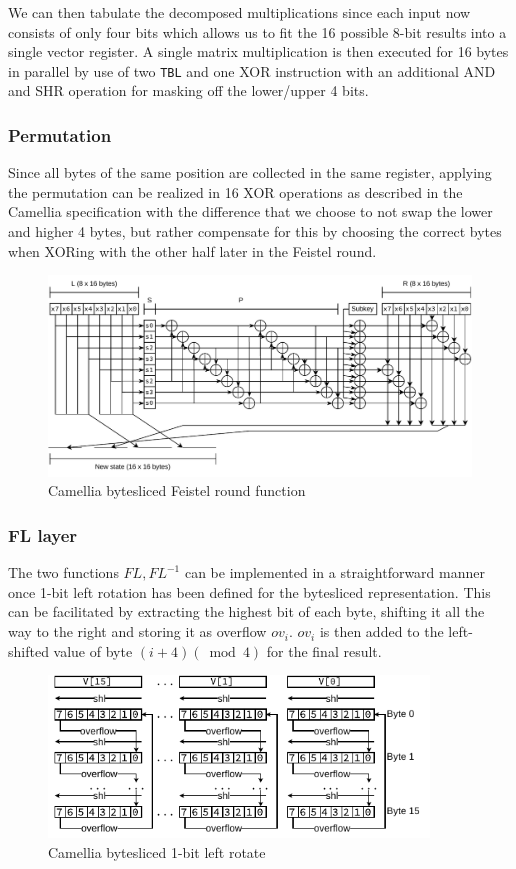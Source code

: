 We can then tabulate the decomposed multiplications since each input now
consists of only four bits which allows us to fit the 16 possible 8-bit results
into a single vector register. A single matrix multiplication is then executed
for 16 bytes in parallel by use of two \texttt{TBL} and one XOR instruction with
an additional AND and SHR operation for masking off the lower/upper 4 bits.

\subsubsection{Permutation}

Since all bytes of the same position are collected in the same register,
applying the permutation can be realized in 16 XOR operations as described in
the Camellia specification with the difference that we choose to not swap the
lower and higher 4 bytes, but rather compensate for this by choosing the
correct bytes when XORing with the other half later in the Feistel round.

\begin{figure}[h!]
    \centering
    \includegraphics[width=\textwidth]{Figures/camelliaround.pdf}
    \caption{Camellia bytesliced Feistel round function}
\end{figure}

\subsubsection{FL layer}

The two functions $FL,FL^{-1}$ can be implemented in a straightforward manner
once 1-bit left rotation has been defined for the bytesliced representation.
This can be facilitated by extracting the highest bit of each byte, shifting it
all the way to the right and storing it as overflow $ov_i$. $ov_i$ is then added
to the left-shifted value of byte $(i + 4) (\bmod 4)$ for the final result.

\begin{figure}[h!]
    \centering
    \includegraphics[width=0.9\textwidth]{Figures/camellia_bytesliced_rol.pdf}
    \caption{Camellia bytesliced 1-bit left rotate}
\end{figure}
